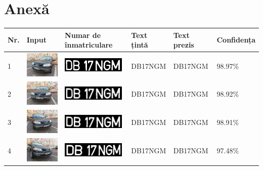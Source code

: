 \documentclass[a4paper,12pt]{report}
\begin{document}
\section*{Anexă}
\begin{longtable}{| m{0.6cm} | m{3cm} | m{3cm} | m{1.8cm} | m{1.8cm} | m{1.8cm} |}
    \hline
    Nr. & Input & Numar de \newline înmatriculare & Text \newline țintă & Text \newline prezis & Confidența \\ \hline
    \endhead
        1 & \includegraphics[width=3cm,keepaspectratio]{dataset/1_d1.jpg} & \includegraphics[width=3cm,keepaspectratio]{segmentari/1.jpg} & DB17NGM & DB17NGM & 98.97\% \\ \hline
        2 & \includegraphics[width=3cm,keepaspectratio]{dataset/1_d2.jpg} & \includegraphics[width=3cm,keepaspectratio]{segmentari/2.jpg} & DB17NGM & DB17NGM & 98.92\% \\ \hline
        3 & \includegraphics[width=3cm,keepaspectratio]{dataset/1_s1.jpg} & \includegraphics[width=3cm,keepaspectratio]{segmentari/3.jpg} & DB17NGM & DB17NGM & 98.91\% \\ \hline
        4 & \includegraphics[width=3cm,keepaspectratio]{dataset/1_s2.jpg} & \includegraphics[width=3cm,keepaspectratio]{segmentari/4.jpg} & DB17NGM & DB17NGM & 97.48\% \\ \hline

\end{longtable}
\end{document}
